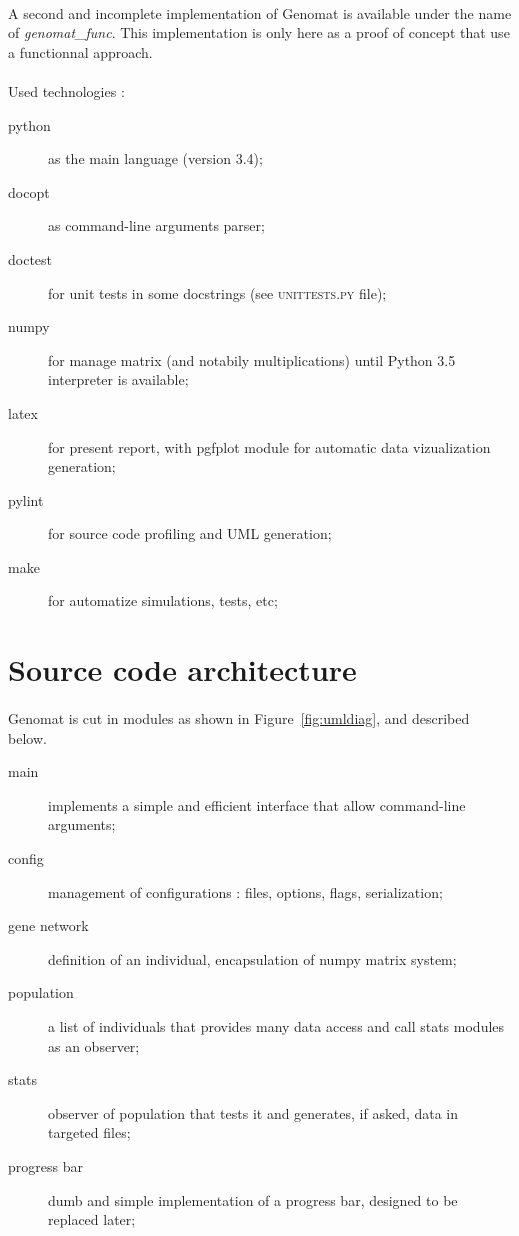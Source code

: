 \documentclass[]{report} %
\begin{document}
	\paragraph*{}
        A second and incomplete implementation of Genomat is available under the name of \textit{genomat\_func}. 
        This implementation is only here as a proof of concept that use a functionnal approach.

	\paragraph*{}
        Used technologies :
        \begin{description}
                \item[python] as the main language (version 3.4);
                \item[docopt] as command-line arguments parser;
                \item[doctest] for unit tests in some docstrings (see \textsc{unittests.py} file);
                \item[numpy] for manage matrix (and notabily multiplications) until Python 3.5 interpreter is available;
                \item[latex] for present report, with pgfplot module for automatic data vizualization generation;
                \item[pylint] for source code profiling and UML generation;
                \item[make] for automatize simulations, tests, etc;
        \end{description}





\section*{Source code architecture}
	\paragraph*{}
        Genomat is cut in modules as shown in Figure~\ref{fig:umldiag}, and described below.
        \begin{description}
                \item[main] implements a simple and efficient interface that allow command-line arguments;
                \item[config] management of configurations : files, options, flags, serialization;
                \item[gene network] definition of an individual, encapsulation of numpy matrix system;
                \item[population] a list of individuals that provides many data access and call stats modules as an observer;
                \item[stats] observer of population that tests it and generates, if asked, data in targeted files;
                \item[progress bar] dumb and simple implementation of a progress bar, designed to be replaced later;
        \end{description}
\end{document}
